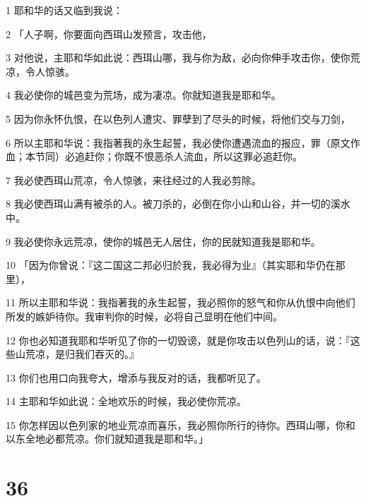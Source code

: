 \par 1 耶和华的话又临到我说：
\par 2 「人子啊，你要面向西珥山发预言，攻击他，
\par 3 对他说，主耶和华如此说：西珥山哪，我与你为敌，必向你伸手攻击你，使你荒凉，令人惊骇。
\par 4 我必使你的城邑变为荒场，成为凄凉。你就知道我是耶和华。
\par 5 因为你永怀仇恨，在以色列人遭灾、罪孽到了尽头的时候，将他们交与刀剑，
\par 6 所以主耶和华说：我指著我的永生起誓，我必使你遭遇流血的报应，罪（原文作血；本节同）必追赶你；你既不恨恶杀人流血，所以这罪必追赶你。
\par 7 我必使西珥山荒凉，令人惊骇，来往经过的人我必剪除。
\par 8 我必使西珥山满有被杀的人。被刀杀的，必倒在你小山和山谷，并一切的溪水中。
\par 9 我必使你永远荒凉，使你的城邑无人居住，你的民就知道我是耶和华。
\par 10 「因为你曾说：『这二国这二邦必归於我，我必得为业』（其实耶和华仍在那里），
\par 11 所以主耶和华说：我指著我的永生起誓，我必照你的怒气和你从仇恨中向他们所发的嫉妒待你。我审判你的时候，必将自己显明在他们中间。
\par 12 你也必知道我耶和华听见了你的一切毁谤，就是你攻击以色列山的话，说：『这些山荒凉，是归我们吞灭的。』
\par 13 你们也用口向我夸大，增添与我反对的话，我都听见了。
\par 14 主耶和华如此说：全地欢乐的时候，我必使你荒凉。
\par 15 你怎样因以色列家的地业荒凉而喜乐，我必照你所行的待你。西珥山哪，你和以东全地必都荒凉。你们就知道我是耶和华。」

\chapter{36}

